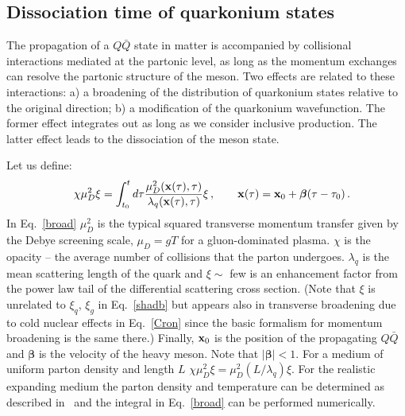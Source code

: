 \documentclass[article,showpacs,preprintnumbers,amsmath,amssymb]{revtex4}
\begin{document}
\subsection{ Dissociation time of quarkonium states }


The propagation of a  $Q\bar{Q}$ state in matter is accompanied by collisional
interactions mediated at the partonic level, as long as the momentum exchanges
can resolve the partonic structure of the meson. Two effects are related to
these interactions: a) a broadening of the distribution of  quarkonium states
relative to the original direction; b) a modification of the quarkonium
wavefunction. The former effect integrates out as long as we consider inclusive
production. The latter effect leads to the dissociation of the  meson state. 

Let us define:
\begin{eqnarray}
&&\chi \mu_D^2 \xi  = \int_{t_0}^t  d\tau \frac{\mu_D^2(\bf{x}(\tau),\tau) }{\lambda_q({\bf x}(\tau),\tau) } \xi\, , \qquad  
{\bf x}(\tau) = {\bf x}_0 + {\bm \beta} (\tau-\tau_0)\, .
\label{broad}
\end{eqnarray}
In Eq.~\ref{broad} $\mu_D^2$ is the typical squared transverse momentum transfer given by the Debye screening 
scale, $\mu_D=g T$ for a gluon-dominated plasma. $\chi$ is the opacity -- the
average number of collisions that the parton undergoes. $\lambda_q$ is the mean
scattering length of the quark and $\xi\sim$ few is an enhancement factor from
the power law tail of the differential scattering cross section.  (Note that
$\xi$ is unrelated to $\xi_q$, $\xi_g$ in Eq.~\ref{shadb} but appears also in 
transverse broadening due to cold nuclear effects in Eq.~\ref{Cron} since the
basic formalism for momentum broadening is the same there.) Finally,
${\bf x}_0$ is the position of the propagating $Q\bar{Q}$ and  ${\bm \beta}$ is
the velocity of the heavy meson. Note that $|{\bm \beta}| < 1$. For a medium of
uniform parton density and length $L$    $\chi \mu_D^2 \xi = \mu_D^2 (L/\lambda_q)
\xi$. For the realistic expanding medium the parton density and temperature can
be determined as described in~\cite{Vitev:2008rz,Neufeld:2010fj} and the
integral in Eq.~\ref{broad} can be performed numerically. 
\end{document}
